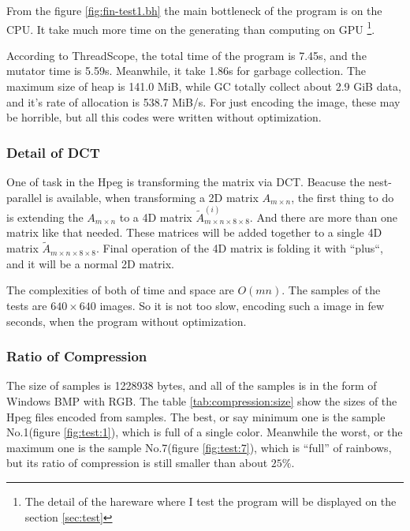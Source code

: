 \documentclass{article}
\begin{document}
From the figure \ref{fig:fin-test1.bh} the main bottleneck of the program is on the CPU.
It take much more time on the generating than computing on GPU%
\footnote{The detail of the hareware where I test the program will be displayed on the section \ref{sec:test}}.

According to ThreadScope, the total time of the program is 7.45s, and the mutator time is 5.59s.
Meanwhile, it take 1.86s for garbage collection. The maximum size of heap is 141.0 MiB,
while GC totally collect about 2.9 GiB data, and it's rate of allocation is 538.7 MiB/s.
For just encoding the image, these may be horrible, but all this codes were written without optimization.

\subsubsection{Detail of DCT}
\label{sec:hpeg:performance:detail}

One of task in the Hpeg is transforming the matrix via DCT. Beacuse the nest-parallel is available,
when transforming a 2D matrix $A_{m \times n}$, the first thing to do is extending the
$A_{m \times n}$ to a 4D matrix $\widetilde{A}^{(i)}_{m \times n \times 8 \times 8}$. 
And there are more than one matrix like that needed. These matrices will be added together to
a single 4D matrix $\widetilde{A}_{m \times n \times 8 \times 8}$.
Final operation of the 4D matrix is folding it with ``plus``, and it will be a normal 2D matrix.

The complexities of both of time and space are $O(mn)$.
The samples of the tests are $640 \times 640$ images.
So it is not too slow, encoding such a image in few seconds, when the program without optimization.

\subsubsection{Ratio of Compression}
\label{sec:hpeg:performance:ratio}

The size of samples is 1228938 bytes, and all of the samples is in the form of Windows BMP with RGB.
The table \ref{tab:compression:size} show the sizes of the Hpeg files encoded from samples.
The best, or say minimum one is the sample No.1(figure \ref{fig:test:1}), 
which is full of a single color. Meanwhile the worst, or the maximum one is the sample
No.7(figure \ref{fig:test:7}), which is ``full'' of rainbows, but its ratio of compression
is still smaller than about $25\%$.
\end{document}
